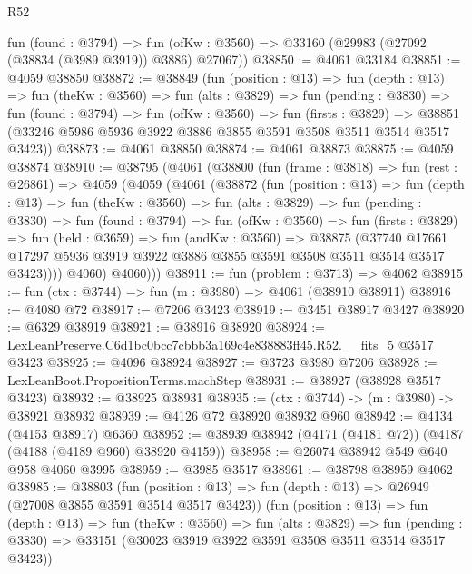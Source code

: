 \begin{lexlean}{R52}
\begin{coremodule}
    fun (found : @3794) =>
    fun (ofKw : @3560) => @33160 (@29983 (@27092 (@38834 (@3989 @3919)) @3886) @27067))
@38850 := @4061 @33184
@38851 := @4059 @38850
@38872 := @38849
    (fun (position : @13) =>
    fun (depth : @13) =>
    fun (theKw : @3560) =>
    fun (alts : @3829) =>
    fun (pending : @3830) =>
    fun (found : @3794) =>
    fun (ofKw : @3560) =>
    fun (firsts : @3829) =>
    @38851 (@33246 @5986 @5936 @3922 @3886 @3855 @3591 @3508 @3511 @3514 @3517 @3423))
@38873 := @4061 @38850
@38874 := @4061 @38873
@38875 := @4059 @38874
@38910 := @38795
    (@4061
      (@38800
        (fun (frame : @3818) =>
        fun (rest : @26861) =>
        @4059
          (@4059
            (@4061
              (@38872
                (fun (position : @13) =>
                fun (depth : @13) =>
                fun (theKw : @3560) =>
                fun (alts : @3829) =>
                fun (pending : @3830) =>
                fun (found : @3794) =>
                fun (ofKw : @3560) =>
                fun (firsts : @3829) =>
                fun (held : @3659) =>
                fun (andKw : @3560) =>
                @38875
                  (@37740
                    @17661
                    @17297
                    @5936
                    @3919
                    @3922
                    @3886
                    @3855
                    @3591
                    @3508
                    @3511
                    @3514
                    @3517
                    @3423))))
            @4060)
          @4060)))
@38911 := fun (problem : @3713) => @4062
@38915 := fun (ctx : @3744) => fun (m : @3980) => @4061 (@38910 @38911)
@38916 := @4080 @72
@38917 := @7206 @3423
@38919 := @3451 @38917 @3427
@38920 := @6329 @38919
@38921 := @38916 @38920
@38924 := LexLeanPreserve.C6d1bc0bcc7cbbb3a169c4e838883ff45.R52.__fits_5 @3517 @3423
@38925 := @4096 @38924
@38927 := @3723 @3980 @7206
@38928 := LexLeanBoot.PropositionTerms.machStep
@38931 := @38927 (@38928 @3517 @3423)
@38932 := @38925 @38931
@38935 := (ctx : @3744) -> (m : @3980) -> @38921 @38932
@38939 := @4126 @72 @38920 @38932 @960
@38942 := @4134 (@4153 @38917) @6360
@38952 := @38939 @38942 (@4171 (@4181 @72)) (@4187 (@4188 (@4189 @960) @38920 @4159))
@38958 := @26074 @38942 @549 @640 @958 @4060 @3995
@38959 := @3985 @3517
@38961 := @38798 @38959 @4062
@38985 := @38803
    (fun (position : @13) => fun (depth : @13) => @26949 (@27008 @3855 @3591 @3514 @3517 @3423))
    (fun (position : @13) =>
    fun (depth : @13) =>
    fun (theKw : @3560) =>
    fun (alts : @3829) =>
    fun (pending : @3830) => @33151 (@30023 @3919 @3922 @3591 @3508 @3511 @3514 @3517 @3423))

\end{coremodule}
\end{lexlean}
